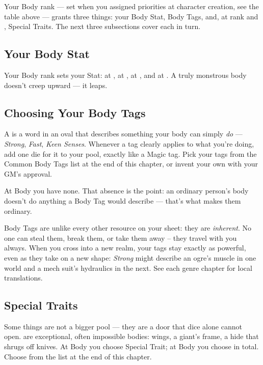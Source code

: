 Your Body rank --- set when you assigned priorities at character
creation, see the table above --- grants three things: your Body Stat,
Body Tags, and, at rank  and , Special Traits. The
next three subsections cover each in turn.

\subsection*{Your Body Stat}
Your Body rank sets your  Stat:  at ,
 at ,  at , and  at
. A truly monstrous body doesn't creep upward --- it leaps.

\subsection*{Choosing Your Body Tags}
A  is a word in an oval that describes something your
body can simply \emph{do} --- \emph{Strong}, \emph{Fast}, \emph{Keen
Senses}. Whenever a tag clearly applies to what you're doing, add one die
for it to your pool, exactly like a Magic tag. Pick your tags from the
Common Body Tags list at the end of this chapter, or invent your own with
your GM's approval.

At Body  you have none. That absence is the point: an ordinary
person's body doesn't do anything a Body Tag would describe --- that's
what makes them ordinary.

Body Tags are unlike every other resource on your sheet: they are
\emph{inherent}. No one can steal them, break them, or take them away --
they travel with you always. When you cross into a new realm, your tags
stay exactly as powerful, even as they take on a new shape: \emph{Strong}
might describe an ogre's muscle in one world and a mech suit's hydraulics
in the next. See each genre chapter for local translations.

\subsection*{Special Traits}
Some things are not a bigger pool --- they are a door that dice alone
cannot open.  are exceptional, often impossible
bodies: wings, a giant's frame, a hide that shrugs off knives. At Body
 you choose  Special Trait; at Body  you
choose  in total. Choose from the list at the end of this
chapter.

